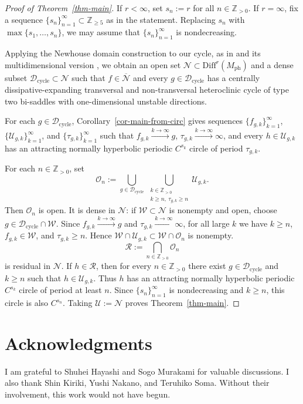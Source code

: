 \documentclass[11pt,a4paper]{article}
\theoremstyle{plain}
\theoremstyle{definition}
\theoremstyle{plain}
\numberwithin{equation}{section}
\begin{document}
\begin{proof}[Proof of Theorem~\ref{thm-main}]
If $r < \infty$, set $s_n := r$ for all $n \in \mathbb{Z}_{>0}$. If $r = \infty$, fix a sequence $\{s_n\}_{n=1}^\infty \subset \mathbb{Z}_{\ge 5}$ as in the statement. Replacing $s_n$ with $\max\{s_1,\dots,s_n\}$, we may assume that $\{s_n\}_{n=1}^\infty$ is nondecreasing.

Applying the Newhouse domain construction to our cycle, as in \cite{GTS1997} and its multidimensional version \cite[Section~1.2]{GST2008}, we obtain an open set $\mathcal{N} \subset \mathrm{Diff}^r(M_\mathrm{ph})$ and a dense subset $\mathcal{D}_\mathrm{cycle} \subset \mathcal{N}$ such that $f \in \overline{\mathcal{N}}$ and every $g \in \mathcal{D}_\mathrm{cycle}$ has a centrally dissipative-expanding transversal and non-transversal heteroclinic cycle of type two bi-saddles with one-dimensional unstable directions.

For each $g \in \mathcal{D}_\mathrm{cycle}$, Corollary~\ref{cor-main-from-circ} gives sequences $\{f_{g,k}\}_{k=1}^\infty$, $\{\mathcal{U}_{g,k}\}_{k=1}^\infty$, and $\{\tau_{g,k}\}_{k=1}^\infty$ such that $f_{g,k} \xrightarrow{k\to\infty} g$, $\tau_{g,k} \xrightarrow{k\to\infty} \infty$, and every $h \in \mathcal{U}_{g,k}$ has an attracting normally hyperbolic periodic $C^{s_k}$ circle of period $\tau_{g,k}$.

For each $n \in \mathbb{Z}_{>0}$, set
\[
\mathcal{O}_n := \bigcup_{g \in \mathcal{D}_\mathrm{cycle}} \, \bigcup_{\substack{k \in \mathbb{Z}_{>0} \\ k \ge n,\ \tau_{g,k} \ge n}} \mathcal{U}_{g,k}.
\]
Then $\mathcal{O}_n$ is open. It is dense in $\mathcal{N}$: if $\mathcal{W} \subset \mathcal{N}$ is nonempty and open, choose $g \in \mathcal{D}_\mathrm{cycle} \cap \mathcal{W}$. Since $f_{g,k} \xrightarrow{k\to\infty} g$ and $\tau_{g,k} \xrightarrow{k\to\infty} \infty$, for all large $k$ we have $k \ge n$, $f_{g,k} \in \mathcal{W}$, and $\tau_{g,k} \ge n$. Hence $\mathcal{W} \cap \mathcal{U}_{g,k} \subset \mathcal{W} \cap \mathcal{O}_n$ is nonempty.
\[
\mathcal{R} := \bigcap_{n \in \mathbb{Z}_{>0}} \mathcal{O}_n
\]
is residual in $\mathcal{N}$. If $h \in \mathcal{R}$, then for every $n \in \mathbb{Z}_{>0}$ there exist $g \in \mathcal{D}_\mathrm{cycle}$ and $k \ge n$ such that $h \in \mathcal{U}_{g,k}$. Thus $h$ has an attracting normally hyperbolic periodic $C^{s_k}$ circle of period at least $n$. Since $\{s_n\}_{n=1}^\infty$ is nondecreasing and $k \ge n$, this circle is also $C^{s_n}$. Taking $\mathcal{U} := \mathcal{N}$ proves Theorem~\ref{thm-main}.
\end{proof}

\section*{Acknowledgments}
I am grateful to Shuhei Hayashi and Sogo Murakami for valuable discussions. I also thank Shin Kiriki, Yushi Nakano, and Teruhiko Soma. Without their involvement, this work would not have begun.



\end{document}
